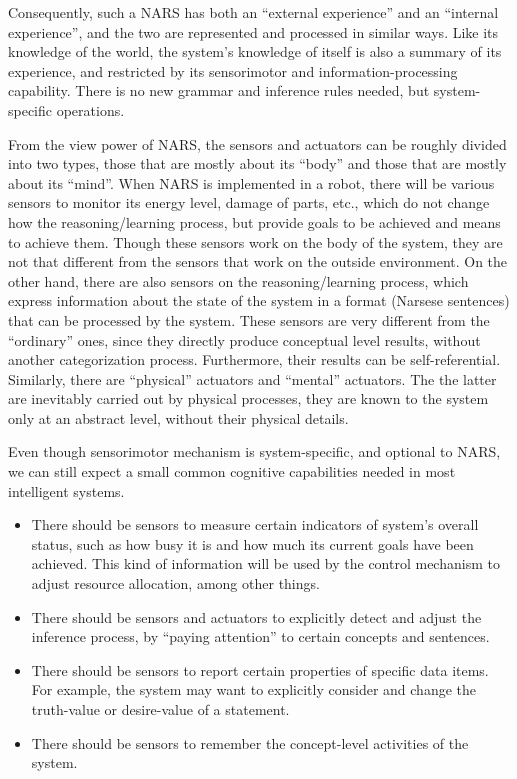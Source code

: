 Consequently, such a NARS has both an ``external experience'' and an ``internal experience'', and the two are represented and processed in similar ways. Like its knowledge of the world, the system's knowledge of itself is also a summary of its experience, and restricted by its sensorimotor and information-processing capability. There is no new grammar and inference rules needed, but system-specific operations. 

From the view power of NARS, the sensors and actuators can be roughly divided into two types, those that are mostly about its ``body'' and those that are mostly about its ``mind''. When NARS is implemented in a robot, there will be various sensors to monitor its energy level, damage of parts, etc., which do not change how the reasoning/learning process, but provide goals to be achieved and means to achieve them. Though these sensors work on the body of the system, they are not that different from the sensors that work on the outside environment. On the other hand, there are also sensors on the reasoning/learning process, which express information about the state of the system in a format (Narsese sentences) that can be processed by the system. These sensors are very different from the ``ordinary'' ones, since they directly produce conceptual level results, without another categorization process. Furthermore, their results can be self-referential. Similarly, there are ``physical'' actuators and ``mental'' actuators. The the latter are inevitably carried out by physical processes, they are known to the system only at an abstract level, without their physical details.

Even though sensorimotor mechanism is system-specific, and optional to NARS, we can still expect a small common cognitive capabilities needed in most intelligent systems.
\begin{itemize}
	\item There should be sensors to measure certain indicators of system's overall status, such as how busy it is and how much its current goals have been achieved. This kind of information will be used by the control mechanism to adjust resource allocation, among other things.
	\item There should be sensors and actuators to explicitly detect and adjust the inference process, by ``paying attention'' to certain concepts and sentences.
	\item There should be sensors to report certain properties of specific data items. For example, the system may want to explicitly consider and change the truth-value or desire-value of a statement.
	\item There should be sensors to remember the concept-level activities of the system.
\end{itemize}

